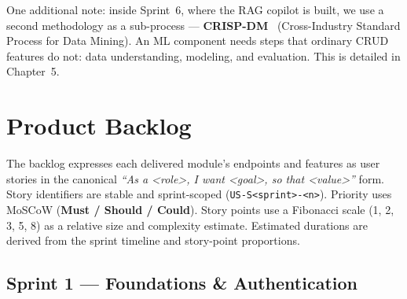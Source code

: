 One additional note: inside Sprint~6, where the RAG copilot is built, we use a second
methodology as a sub-process --- \textbf{CRISP-DM}~\cite{shearer2000crisp} (Cross-Industry
Standard Process for Data Mining). An ML component needs steps that ordinary CRUD features do
not: data understanding, modeling, and evaluation. This is detailed in Chapter~5.

\section{Product Backlog}

The backlog expresses each delivered module's endpoints and features as user stories in the
canonical \emph{``As a <role>, I want <goal>, so that <value>''} form. Story identifiers are
stable and sprint-scoped (\texttt{US-S<sprint>-<n>}). Priority uses MoSCoW (\textbf{Must / Should
/ Could}). Story points use a Fibonacci scale (1, 2, 3, 5, 8) as a relative size and complexity
estimate. Estimated durations are derived from the sprint timeline and story-point proportions.

\subsection{Sprint 1 --- Foundations \& Authentication}


